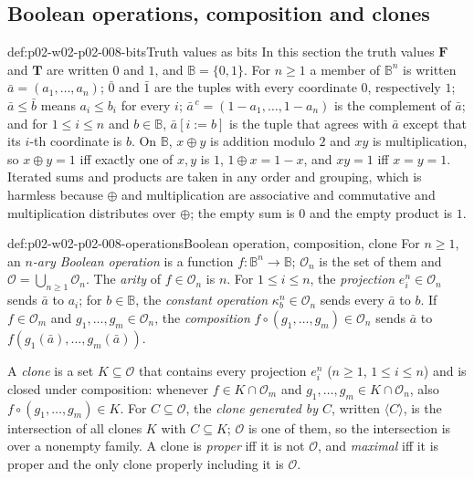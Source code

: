 \subsection{Boolean operations, composition and clones}
\label{sec:p02-w02-p02-008-clones}

\begin{hbconvention}{def:p02-w02-p02-008-bits}{Truth values as bits}
In this section the truth values \(\mathbf F\) and \(\mathbf T\) are written
\(0\) and \(1\), and \(\mathbb B=\{0,1\}\).  For \(n\geq1\) a member of
\(\mathbb B^n\) is written \(\bar a=(a_1,\ldots,a_n)\); \(\bar0\) and
\(\bar1\) are the tuples with every coordinate \(0\), respectively \(1\);
\(\bar a\leq\bar b\) means \(a_i\leq b_i\) for every \(i\);
\(\bar a^{\,c}=(1-a_1,\ldots,1-a_n)\) is the complement of \(\bar a\); and
for \(1\leq i\leq n\) and \(b\in\mathbb B\), \(\bar a[i{:=}b]\) is the
tuple that agrees with \(\bar a\) except that its \(i\)-th coordinate is
\(b\).  On \(\mathbb B\), \(x\oplus y\) is addition modulo \(2\) and \(xy\)
is multiplication, so \(x\oplus y=1\) iff exactly one of \(x,y\) is \(1\),
\(1\oplus x=1-x\), and \(xy=1\) iff \(x=y=1\).  Iterated sums and products
are taken in any order and grouping, which is harmless because \(\oplus\)
and multiplication are associative and commutative and multiplication
distributes over \(\oplus\); the empty sum is \(0\) and the empty product is
\(1\).
\end{hbconvention}

\begin{hbdefinition}{def:p02-w02-p02-008-operations}{Boolean operation, composition, clone}
For \(n\geq1\), an \emph{\(n\)-ary Boolean operation} is a function
\(f:\mathbb B^n\to\mathbb B\); \(\mathcal O_n\) is the set of them and
\(\mathcal O=\bigcup_{n\geq1}\mathcal O_n\).  The \emph{arity} of
\(f\in\mathcal O_n\) is \(n\).  For \(1\leq i\leq n\), the \emph{projection}
\(e^n_i\in\mathcal O_n\) sends \(\bar a\) to \(a_i\); for
\(b\in\mathbb B\), the \emph{constant operation} \(\kappa^n_b\in\mathcal O_n\)
sends every \(\bar a\) to \(b\).  If \(f\in\mathcal O_m\) and
\(g_1,\ldots,g_m\in\mathcal O_n\), the \emph{composition}
\(f\circ(g_1,\ldots,g_m)\in\mathcal O_n\) sends \(\bar a\) to
\(f(g_1(\bar a),\ldots,g_m(\bar a))\).

A \emph{clone} is a set \(K\subseteq\mathcal O\) that contains every
projection \(e^n_i\) (\(n\geq1\), \(1\leq i\leq n\)) and is closed under
composition: whenever \(f\in K\cap\mathcal O_m\) and
\(g_1,\ldots,g_m\in K\cap\mathcal O_n\), also
\(f\circ(g_1,\ldots,g_m)\in K\).  For \(C\subseteq\mathcal O\), the
\emph{clone generated by \(C\)}, written \(\langle C\rangle\), is the
intersection of all clones \(K\) with \(C\subseteq K\); \(\mathcal O\) is
one of them, so the intersection is over a nonempty family.  A clone is
\emph{proper} iff it is not \(\mathcal O\), and \emph{maximal} iff it is
proper and the only clone properly including it is \(\mathcal O\).
\end{hbdefinition}

